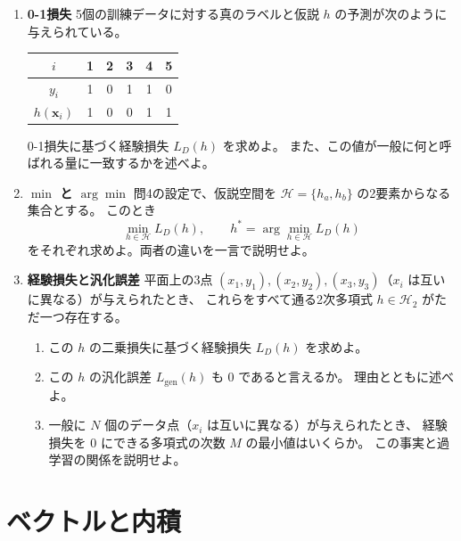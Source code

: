 \begin{enumerate}
  \item \textbf{0-1損失}\quad
    5個の訓練データに対する真のラベルと仮説 $h$ の予測が次のように与えられている。
    \begin{center}
      \begin{tabular}{c|ccccc}
        $i$ & 1 & 2 & 3 & 4 & 5 \\
        \hline
        $y_i$ & 1 & 0 & 1 & 1 & 0 \\
        $h(\bm{x}_i)$ & 1 & 0 & 0 & 1 & 1 \\
      \end{tabular}
    \end{center}
    0-1損失に基づく経験損失 $L_D(h)$ を求めよ。
    また、この値が一般に何と呼ばれる量に一致するかを述べよ。

  \item \textbf{$\min$ と $\arg\min$}\quad
    問4の設定で、仮説空間を $\mathcal{H} = \{h_a, h_b\}$ の2要素からなる集合とする。
    このとき
    \begin{equation*}
      \min_{h \in \mathcal{H}} L_D(h), \qquad h^* = \arg\min_{h \in \mathcal{H}} L_D(h)
    \end{equation*}
    をそれぞれ求めよ。両者の違いを一言で説明せよ。

  \item \textbf{経験損失と汎化誤差}\quad
    平面上の3点 $(x_1, y_1), (x_2, y_2), (x_3, y_3)$（$x_i$ は互いに異なる）が与えられたとき、
    これらをすべて通る2次多項式 $h \in \mathcal{H}_2$ がただ一つ存在する。
    \begin{enumerate}
      \item この $h$ の二乗損失に基づく経験損失 $L_D(h)$ を求めよ。
      \item この $h$ の汎化誤差 $L_{\mathrm{gen}}(h)$ も $0$ であると言えるか。
        理由とともに述べよ。
      \item 一般に $N$ 個のデータ点（$x_i$ は互いに異なる）が与えられたとき、
        経験損失を $0$ にできる多項式の次数 $M$ の最小値はいくらか。
        この事実と過学習の関係を説明せよ。
    \end{enumerate}

\end{enumerate}




\pagebreak

\section{ベクトルと内積}

